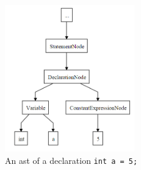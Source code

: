 \begin{figure}
\centering
\includegraphics[width=0.5\textwidth]{figures/Trees/ASTAlone.PNG}
\caption{An \acrshort{ast} of a declaration \texttt{int a = 5;}}\label{fig:ASTAlone}
\end{figure}


